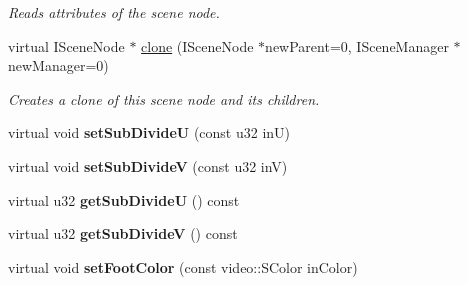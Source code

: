 \begin{DoxyCompactItemize}
\begin{DoxyCompactList}\small\item\em Reads attributes of the scene node. \end{DoxyCompactList}\item 
\hypertarget{classirr_1_1scene_1_1_c_volume_light_scene_node_a1da414a48b17c6f10c4d58868c473505}{virtual I\-Scene\-Node $\ast$ \hyperlink{classirr_1_1scene_1_1_c_volume_light_scene_node_a1da414a48b17c6f10c4d58868c473505}{clone} (I\-Scene\-Node $\ast$new\-Parent=0, I\-Scene\-Manager $\ast$new\-Manager=0)}\label{classirr_1_1scene_1_1_c_volume_light_scene_node_a1da414a48b17c6f10c4d58868c473505}

\begin{DoxyCompactList}\small\item\em Creates a clone of this scene node and its children. \end{DoxyCompactList}\item 
\hypertarget{classirr_1_1scene_1_1_c_volume_light_scene_node_a129d0c0741329bed1b6800cc7f2d8d8f}{virtual void {\bfseries set\-Sub\-Divide\-U} (const u32 in\-U)}\label{classirr_1_1scene_1_1_c_volume_light_scene_node_a129d0c0741329bed1b6800cc7f2d8d8f}

\item 
\hypertarget{classirr_1_1scene_1_1_c_volume_light_scene_node_ad604f24310555b0b779efb5906fe6c08}{virtual void {\bfseries set\-Sub\-Divide\-V} (const u32 in\-V)}\label{classirr_1_1scene_1_1_c_volume_light_scene_node_ad604f24310555b0b779efb5906fe6c08}

\item 
\hypertarget{classirr_1_1scene_1_1_c_volume_light_scene_node_ae8a419b860beab0b64a5b325fd297bae}{virtual u32 {\bfseries get\-Sub\-Divide\-U} () const }\label{classirr_1_1scene_1_1_c_volume_light_scene_node_ae8a419b860beab0b64a5b325fd297bae}

\item 
\hypertarget{classirr_1_1scene_1_1_c_volume_light_scene_node_ab6a7295bf770712987885781b1a94635}{virtual u32 {\bfseries get\-Sub\-Divide\-V} () const }\label{classirr_1_1scene_1_1_c_volume_light_scene_node_ab6a7295bf770712987885781b1a94635}

\item 
\hypertarget{classirr_1_1scene_1_1_c_volume_light_scene_node_a412b07dec645b668033893cf4294f741}{virtual void {\bfseries set\-Foot\-Color} (const video\-::\-S\-Color in\-Color)}\label{classirr_1_1scene_1_1_c_volume_light_scene_node_a412b07dec645b668033893cf4294f741}


\end{DoxyCompactItemize}
